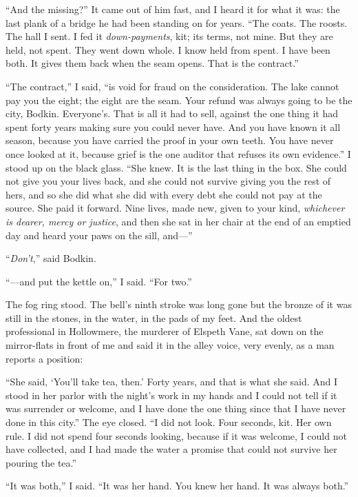 ``And the missing?'' It came out of him fast, and I heard it for what it was: the last plank of a bridge he had been standing on for years. ``The coats. The roosts. The hall I sent. I fed it \emph{down-payments}, kit; its terms, not mine. But they are held, not spent. They went down whole. I know held from spent. I have been both. It gives them back when the seam opens. That is the contract.''

``The contract,'' I said, ``is void for fraud on the consideration. The lake cannot pay you the eight; the eight are the seam. Your refund was always going to be the city, Bodkin. Everyone's. That is all it had to sell, against the one thing it had spent forty years making sure you could never have. And you have known it all season, because you have carried the proof in your own teeth. You have never once looked at it, because grief is the one auditor that refuses its own evidence.'' I stood up on the black glass. ``She knew. It is the last thing in the box. She could not give you your lives back, and she could not survive giving you the rest of hers, and so she did what she did with every debt she could not pay at the source. She paid it forward. Nine lives, made new, given to your kind, \emph{whichever is dearer, mercy or justice}, and then she sat in her chair at the end of an emptied day and heard your paws on the sill, and---''

``\emph{Don't},'' said Bodkin.

``---and put the kettle on,'' I said. ``For two.''

The fog ring stood. The bell's ninth stroke was long gone but the bronze of it was still in the stones, in the water, in the pads of my feet. And the oldest professional in Hollowmere, the murderer of Elspeth Vane, sat down on the mirror-flats in front of me and said it in the alley voice, very evenly, as a man reports a position:

``She said, `You'll take tea, then.' Forty years, and that is what she said. And I stood in her parlor with the night's work in my hands and I could not tell if it was surrender or welcome, and I have done the one thing since that I have never done in this city.'' The eye closed. ``I did not look. Four seconds, kit. Her own rule. I did not spend four seconds looking, because if it was welcome, I could not have collected, and I had made the water a promise that could not survive her pouring the tea.''

``It was both,'' I said. ``It was her hand. You knew her hand. It was always both.''

